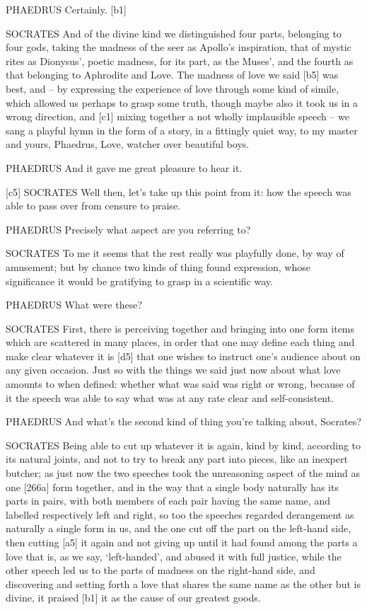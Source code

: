 PHAEDRUS Certainly. {[}b1{]}

SOCRATES And of the divine kind we distinguished four parts, belonging
to four gods, taking the madness of the seer as Apollo's inspiration,
that of mystic rites as Dionysus', poetic madness, for its part, as the
Muses', and the fourth as that belonging to Aphrodite and Love. The
madness of love we said {[}b5{]} was best, and -- by expressing the
experience of love through some kind of simile, which allowed us perhaps
to grasp some truth, though maybe also it took us in a wrong direction,
and {[}c1{]} mixing together a not wholly implausible speech -- we sang
a playful hymn in the form of a story, in a fittingly quiet way, to my
master and yours, Phaedrus, Love, watcher over beautiful boys.

PHAEDRUS And it gave me great pleasure to hear it.

{[}c5{]} SOCRATES Well then, let's take up this point from it: how the
speech was able to pass
over from censure to praise.

PHAEDRUS Precisely what aspect are you referring to?

SOCRATES To me it seems that the rest really was playfully done, by way
of amusement; but by chance two kinds of
thing found expression,
whose significance it would be gratifying to grasp in a scientific way.

PHAEDRUS What were these?

SOCRATES First, there is perceiving together and bringing into one form
items which are scattered in many
places, in order that
one may define each thing and make clear whatever it is {[}d5{]} that
one wishes to instruct
one's audience about on any given occasion. Just so with the things we
said just now about what love amounts to when defined: whether what was
said was right or wrong, because of it the
speech was able to say
what was at any rate clear and self-consistent.

PHAEDRUS And what's the second kind of thing you're talking about,
Socrates?

SOCRATES Being able to cut up whatever it is again, kind by
kind, according to its
natural joints, and not to try to break any part into pieces, like an
inexpert butcher; as just now the two speeches took the unreasoning
aspect of the mind as one {[}266a{]} form together, and in the way that
a single body naturally has its parts in pairs, with both members of
each pair having the same name, and labelled respectively left and
right, so too the speeches regarded derangement as naturally a single
form in us, and the one cut off the part on the left-hand side, then
cutting {[}a5{]} it again and not giving up until it had found among the
parts a love that is, as we say, ‘left-handed', and abused it with full
justice, while the other speech led us to the parts of madness on the
right-hand side, and discovering and setting forth a love that shares
the same name as the other but is divine, it praised {[}b1{]} it as the
cause of our greatest goods.

